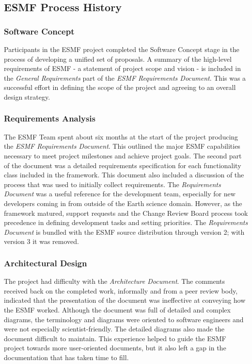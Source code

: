 \subsection{ESMF Process History}

\subsubsection{Software Concept}
Participants in the ESMF project completed the Software Concept
stage in the process of developing a unified set of proposals.
A summary of the high-level requirements of ESMF - a statement of project
scope and vision - is included in the {\it General Requirements}
part of the {\it ESMF Requirements Document}\cite{bib:ESMFreqdoc}.
This was a successful effort in defining the scope of the project
and agreeing to an overall design strategy.

\subsubsection {Requirements Analysis}
The ESMF Team spent about six months at the start of the project
producing the {\it ESMF Requirements Document}.
This outlined the major ESMF capabilities necessary to meet project milestones
and achieve project goals.  The second part of the document was a detailed 
requirements specification for each functionality class included in 
the framework.  This document also included a discussion of the 
process that was used to initially collect requirements.
The {\it Requirements Document} was a useful reference for the development
team, especially for new developers coming in from outside of the
Earth science domain.  However, as the framework matured, support
requests and the Change Review Board process took precedence in defining
development tasks and setting priorities.  The {\it Requirements 
Document} is bundled with the ESMF source distribution through version 2;
with version 3 it was removed.  

\subsubsection{Architectural Design}
The project had difficulty with the {\it Architecture Document}.  
The comments received back on the completed work, informally and
from a peer review body, indicated that the presentation of the document
was ineffective at conveying how the ESMF worked. Although the
document was full of detailed and complex diagrams, the terminology and
diagrams were oriented to software engineers and were not especially
scientist-friendly.  The detailed diagrams also made the document difficult
to maintain.  This experience helped to guide the ESMF project 
towards more user-oriented documents, but it also left a gap in the 
documentation that has taken time to fill.

